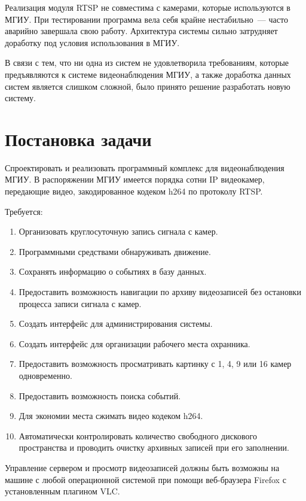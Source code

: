 \medskip

Реализация модуля RTSP не совместима с камерами, которые используются в МГИУ. При тестировании
программа вела себя крайне нестабильно~--- часто аварийно завершала свою работу.
Архитектура системы сильно затрудняет доработку под условия использования в МГИУ.

\medskip

В связи с тем, что ни одна из систем не удовлетворила требованиям, которые предъявляются к системе
видеонаблюдения МГИУ, а также доработка данных систем является слишком сложной, было принято
решение разработать новую систему.


\section{Постановка задачи}

Спроектировать и реализовать программный комплекс для видеонаблюдения МГИУ. В распоряжении МГИУ
имеется порядка сотни IP видеокамер, передающие видео, закодированное кодеком h264 по протоколу RTSP.

\medskip

Требуется:
\smallskip
\begin{enumerate}
	\item Организовать круглосуточную запись сигнала с камер.
	\item Программными средствами обнаруживать движение.
	\item Сохранять информацию о событиях в базу данных.
	\item Предоставить возможность навигации по архиву видеозаписей без остановки процесса записи сигнала с камер.
	\item Создать интерфейс для администрирования системы.
	\item Создать интерфейс для организации рабочего места охранника.
	\item Предоставить возможность просматривать картинку с 1, 4, 9 или 16 камер одновременно.
	\item Предоставить возможность поиска событий.
	\item Для экономии места сжимать видео кодеком h264.
	\item Автоматически контролировать количество свободного дискового пространства и проводить очистку архивных записей при его заполнении.
\end{enumerate}

Управление сервером и просмотр видеозаписей должны быть возможны на машине с любой операционной
системой при помощи веб-браузера Firefox с установленным плагином VLC.


